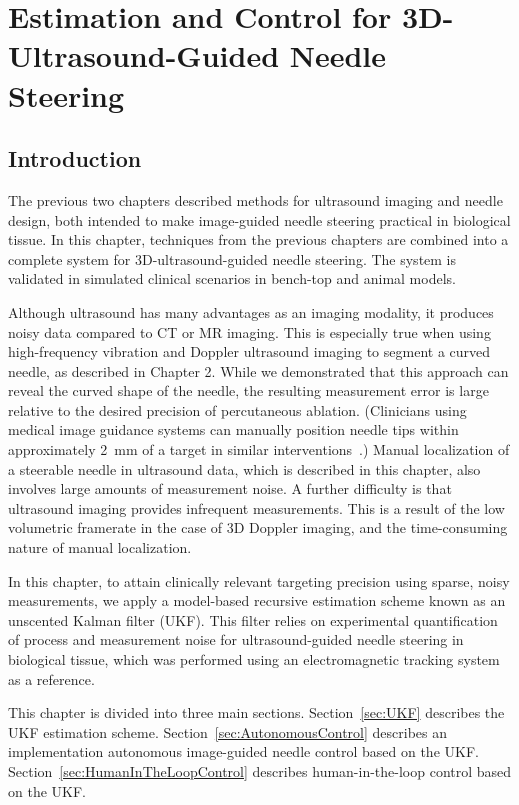\chapter[Estimation and Control]{Estimation and Control for 3D-Ultrasound-Guided Needle Steering}

\section{Introduction}
The previous two chapters described methods for ultrasound imaging and needle design, both intended to make image-guided needle steering practical in biological tissue. In this chapter, techniques from the previous chapters are combined into a complete system for 3D-ultrasound-guided needle steering. The system is validated in simulated clinical scenarios in bench-top and animal models. 

Although ultrasound has many advantages as an imaging modality, it produces noisy data compared to CT or MR imaging. This is especially true when using high-frequency vibration and Doppler ultrasound imaging to segment a curved needle, as described in Chapter 2. While we demonstrated that this approach can reveal the curved shape of the needle, the resulting measurement error is large relative to the desired precision of percutaneous ablation. (Clinicians using medical image guidance systems can manually position needle tips within approximately 2~mm of a target in similar interventions~\cite{Crocetti2008}.) Manual localization of a steerable needle in ultrasound data, which is described in this chapter, also involves large amounts of measurement noise. A further difficulty is that ultrasound imaging provides infrequent measurements. This is a result of the low volumetric framerate in the case of 3D Doppler imaging, and the time-consuming nature of manual localization. 

In this chapter, to attain clinically relevant targeting precision using sparse, noisy measurements, we apply a model-based recursive estimation scheme known as an unscented Kalman filter (UKF). This filter relies on experimental quantification of process and measurement noise for ultrasound-guided needle steering in biological tissue, which was performed using an electromagnetic tracking system as a reference.
 
This chapter is divided into three main sections. Section~\ref{sec:UKF} describes the UKF estimation scheme. Section~\ref{sec:AutonomousControl} describes an implementation autonomous image-guided needle control based on the UKF. Section~\ref{sec:HumanInTheLoopControl} describes human-in-the-loop control based on the UKF.

